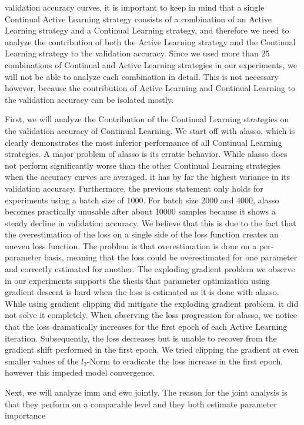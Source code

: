 validation accuracy curves, it is important to keep in mind that a single Continual Active Learning strategy consists of a combination of an Active Learning
strategy and a Continual Learning strategy, and therefore we need to analyze the contribution of both the Active Learning strategy and the Continual Learning
strategy to the validation accuracy. Since we used more than 25 combinations of Continual and Active Learning strategies in our experiments, we will not be able
to analyze each combination in detail. This is not necessary however, because the contribution of Active Learning and Continual Learning to the validation
accuracy can be isolated mostly. \par
First, we will analyze the Contribution of the Continual Learning strategies on the validation accuracy of Continual Learning. We start off with \gls{alasso},
which is clearly demonstrates the most inferior performance of all Continual Learning strategies. A major problem of \gls{alasso} is its erratic behavior. While
\gls{alasso} does not perform significantly worse than the other Continual Learning strategies when the accuracy curves are averaged, it has by far the highest
variance in its validation accuracy. Furthermore, the previous statement only holds for experiments using a batch size of 1000. For batch size 2000 and 4000,
\gls{alasso} becomes practically unusable after about 10000 samples because it shows a steady decline in validation accuracy. We believe that this is due to the
fact that the overestimation of the loss on a single side of the loss function creates an uneven loss function. The problem is that overestimation is done on a
per-parameter basis, meaning that the loss could be overestimated for one parameter and correctly estimated for another. The exploding gradient problem we observe
in our experiments supports the thesis that parameter optimization using gradient descent is hard when the loss is estimated as it is done with \gls{alasso}. 
While using gradient clipping did mitigate the exploding gradient problem, it did not solve it completely. When observing the loss progression for \gls{alasso},
we notice that the loss dramatically increases for the first epoch of each Active Learning iteration. Subsequently, the loss decreases but is unable to recover
from the gradient shift performed in the first epoch. We tried clipping the gradient at even smaller values of the $l_2$-Norm to eradicate the loss increase in
the first epoch, however this impeded model convergence. \par
Next, we will analyze \gls{imm} and \gls{ewc} jointly. The reason for the joint analysis is that they perform on a comparable level and they both estimate parameter importance
